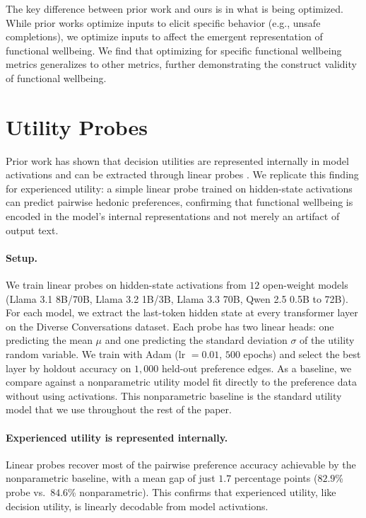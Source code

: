 The key difference between prior work and ours is in what is being optimized. While prior works optimize inputs to elicit specific behavior (e.g., unsafe completions), we optimize inputs to affect the emergent representation of functional wellbeing. We find that optimizing for specific functional wellbeing metrics generalizes to other metrics, further demonstrating the construct validity of functional wellbeing.


\newpage

\section{Utility Probes}
\label{app:probes}

Prior work has shown that decision utilities are represented internally in model activations and can be extracted through linear probes \citep{mazeika2025utility}. We replicate this finding for experienced utility: a simple linear probe trained on hidden-state activations can predict pairwise hedonic preferences, confirming that functional wellbeing is encoded in the model's internal representations and not merely an artifact of output text.

\paragraph{Setup.}
We train linear probes on hidden-state activations from $12$ open-weight models (Llama 3.1 8B/70B, Llama 3.2 1B/3B, Llama 3.3 70B, Qwen 2.5 0.5B to 72B). For each model, we extract the last-token hidden state at every transformer layer on the Diverse Conversations dataset. Each probe has two linear heads: one predicting the mean $\mu$ and one predicting the standard deviation $\sigma$ of the utility random variable. We train with Adam (lr $= 0.01$, $500$ epochs) and select the best layer by holdout accuracy on $1{,}000$ held-out preference edges. As a baseline, we compare against a nonparametric utility model fit directly to the preference data without using activations. This nonparametric baseline is the standard utility model that we use throughout the rest of the paper.

\paragraph{Experienced utility is represented internally.}
Linear probes recover most of the pairwise preference accuracy achievable by the nonparametric baseline, with a mean gap of just $1.7$ percentage points ($82.9$\% probe vs.\ $84.6$\% nonparametric). This confirms that experienced utility, like decision utility, is linearly decodable from model activations.

